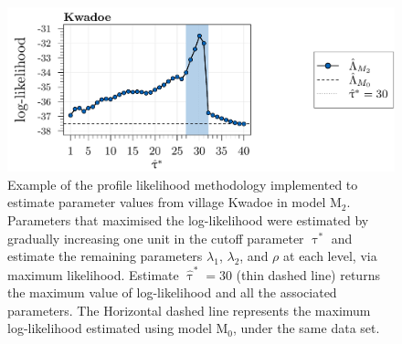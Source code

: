 \begin{figure}[ht!]
\center
\begin{adjustbox}{width=\linewidth}
\includegraphics[width=\columnwidth]{images/profile_kwadoe.pdf}
\end{adjustbox}
\caption[Profile likelihood methodology for estimation of parameters from village Kwadoe, MSP1 antigen data]{Example of the profile likelihood methodology implemented to estimate parameter values from village Kwadoe in model M$_2$. Parameters that maximised the log-likelihood were estimated by gradually increasing one unit in the cutoff parameter $\uptau^*$ and estimate the remaining parameters $\lambda_1$, $\lambda_2$, and $\rho$ at each level, via maximum likelihood. Estimate $ \widehat{\uptau}^*=30$ (thin dashed line) returns the maximum value of log-likelihood and all the associated parameters. The Horizontal dashed line represents the maximum log-likelihood estimated using model M$_0$, under the same data set.}
\label{fig:profile.kwadoe}
\end{figure}

